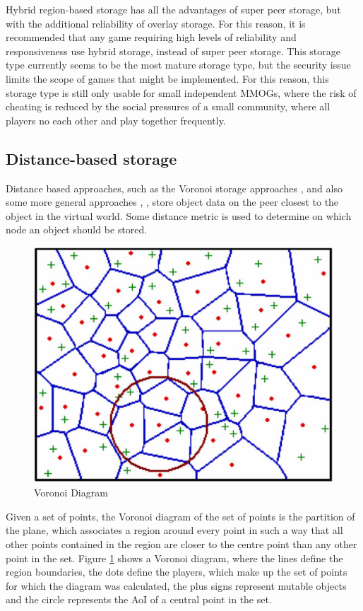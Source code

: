 \documentclass[10pt,a4paper,journal,cspaper,compsoc]{IEEEtran}
\begin{document}
Hybrid region-based storage has all the advantages of super peer storage, but with the additional reliability of overlay storage. For this reason, it
is recommended that any game requiring high levels of reliability and responsiveness use hybrid storage, instead of super peer storage. This storage
type currently seems to be the most mature storage type, but the security issue limits the scope of games that might be implemented. For this reason,
this storage type is still only usable for small independent MMOGs, where the risk of cheating is reduced by the social pressures of a small
community, where all players no each other and play together frequently.

\subsection{Distance-based storage}
\label{distance_based_storage}

Distance based approaches, such as the Voronoi storage approaches \cite{Buyukkaya_voronoi_state_management}, \cite{Hu_voronoi_IM} and also some more
general approaches \cite{colyseus_distance_based}, \cite{solipsis}, store object data on the peer closest to the object in the virtual world. Some
distance metric is used to determine on which node an object should be stored.

\begin{figure}[htbp]
 \centering
 \includegraphics[width=\columnwidth]{voronoi_diagram}
 \caption{Voronoi Diagram \cite{Buyukkaya_voronoi_state_management}}
 \label{fig_voronoi_diagram}
\end{figure}
%
Given a set of points, the Voronoi diagram of the set of points is the partition of the plane, which associates a region around every point in such a
way that all other points contained in the region are closer to the centre point than any other point in the set. Figure \ref{fig_voronoi_diagram}
shows a Voronoi diagram, where the lines define the region boundaries, the dots define the players, which make up the set of points for which the
diagram was calculated, the plus signs represent mutable objects and the circle represents the \ac{AoI} of a central point in the set.
\end{document}
